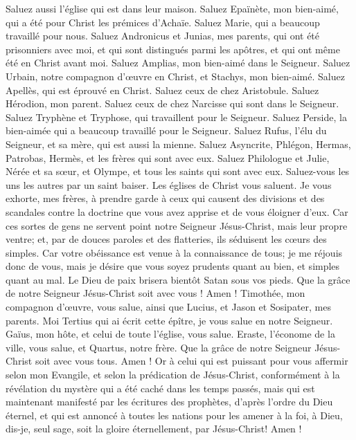 \begin{multicols}{2}
Saluez aussi l'église qui est dans leur maison. Saluez Epaïnète, mon bien-aimé, qui a été pour Christ les prémices d'Achaïe.
Saluez Marie, qui a beaucoup travaillé pour nous.
Saluez Andronicus et Junias, mes parents, qui ont été prisonniers avec moi, et qui sont distingués parmi les apôtres, et qui ont même été en Christ avant moi.
Saluez Amplias, mon bien-aimé dans le Seigneur.
Saluez Urbain, notre compagnon d'œuvre en Christ, et Stachys, mon bien-aimé.
Saluez Apellès, qui est éprouvé en Christ. Saluez ceux de chez Aristobule.
Saluez Hérodion, mon parent. Saluez ceux de chez Narcisse qui sont dans le Seigneur.
Saluez Tryphène et Tryphose, qui travaillent pour le Seigneur. Saluez Perside, la bien-aimée qui a beaucoup travaillé pour le Seigneur.
Saluez Rufus, l'élu du Seigneur, et sa mère, qui est aussi la mienne.
Saluez Asyncrite, Phlégon, Hermas, Patrobas, Hermès, et les frères qui sont avec eux.
Saluez Philologue et Julie, Nérée et sa sœur, et Olympe, et tous les saints qui sont avec eux.
Saluez-vous les uns les autres par un saint baiser. Les églises de Christ vous saluent.
Je vous exhorte, mes frères, à prendre garde à ceux qui causent des divisions et des scandales contre la doctrine que vous avez apprise et de vous éloigner d'eux.
Car ces sortes de gens ne servent point notre Seigneur Jésus-Christ, mais leur propre ventre; et, par de douces paroles et des flatteries, ils séduisent les cœurs des simples.
Car votre obéissance est venue à la connaissance de tous; je me réjouis donc de vous, mais je désire que vous soyez prudents quant au bien, et simples quant au mal.
Le Dieu de paix brisera bientôt Satan sous vos pieds. Que la grâce de notre Seigneur Jésus-Christ soit avec vous ! Amen !
Timothée, mon compagnon d'œuvre, vous salue, ainsi que Lucius, et Jason et Sosipater, mes parents.
Moi Tertius qui ai écrit cette épître, je vous salue en notre Seigneur.
Gaïus, mon hôte, et celui de toute l'église, vous salue. Eraste, l'économe de la ville, vous salue, et Quartus, notre frère.
Que la grâce de notre Seigneur Jésus-Christ soit avec vous tous. Amen !
Or à celui qui est puissant pour vous affermir selon mon Evangile, et selon la prédication de Jésus-Christ, conformément à la révélation du mystère qui a été caché dans les temps passés,
mais qui est maintenant manifesté par les écritures des prophètes, d'après l'ordre du Dieu éternel, et qui est annoncé à toutes les nations pour les amener à la foi,
à Dieu, dis-je, seul sage, soit la gloire éternellement, par Jésus-Christ! Amen !
\PPE{}
\end{multicols}
